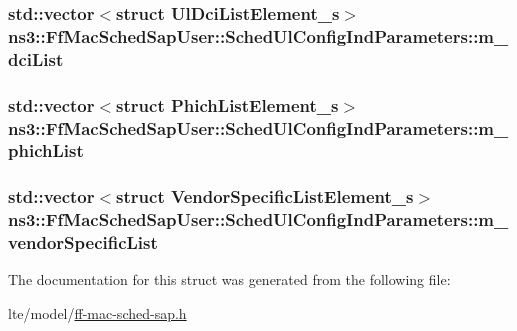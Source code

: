 \subsubsection[{\texorpdfstring{m\+\_\+dci\+List}{m_dciList}}]{\setlength{\rightskip}{0pt plus 5cm}std\+::vector$<$struct {\bf Ul\+Dci\+List\+Element\+\_\+s}$>$ ns3\+::\+Ff\+Mac\+Sched\+Sap\+User\+::\+Sched\+Ul\+Config\+Ind\+Parameters\+::m\+\_\+dci\+List}\hypertarget{structns3_1_1FfMacSchedSapUser_1_1SchedUlConfigIndParameters_aef61e9596b02d9d16bcb090889f30c18}{}\label{structns3_1_1FfMacSchedSapUser_1_1SchedUlConfigIndParameters_aef61e9596b02d9d16bcb090889f30c18}
\subsubsection[{\texorpdfstring{m\+\_\+phich\+List}{m_phichList}}]{\setlength{\rightskip}{0pt plus 5cm}std\+::vector$<$struct {\bf Phich\+List\+Element\+\_\+s}$>$ ns3\+::\+Ff\+Mac\+Sched\+Sap\+User\+::\+Sched\+Ul\+Config\+Ind\+Parameters\+::m\+\_\+phich\+List}\hypertarget{structns3_1_1FfMacSchedSapUser_1_1SchedUlConfigIndParameters_ab26f492098c355f8819697698c0aab43}{}\label{structns3_1_1FfMacSchedSapUser_1_1SchedUlConfigIndParameters_ab26f492098c355f8819697698c0aab43}
\subsubsection[{\texorpdfstring{m\+\_\+vendor\+Specific\+List}{m_vendorSpecificList}}]{\setlength{\rightskip}{0pt plus 5cm}std\+::vector$<$struct {\bf Vendor\+Specific\+List\+Element\+\_\+s}$>$ ns3\+::\+Ff\+Mac\+Sched\+Sap\+User\+::\+Sched\+Ul\+Config\+Ind\+Parameters\+::m\+\_\+vendor\+Specific\+List}\hypertarget{structns3_1_1FfMacSchedSapUser_1_1SchedUlConfigIndParameters_aa8e9611a38a06b56c7f7c4ff2d959d65}{}\label{structns3_1_1FfMacSchedSapUser_1_1SchedUlConfigIndParameters_aa8e9611a38a06b56c7f7c4ff2d959d65}


The documentation for this struct was generated from the following file\+:\begin{DoxyCompactItemize}
\item 
lte/model/\hyperlink{ff-mac-sched-sap_8h}{ff-\/mac-\/sched-\/sap.\+h}\end{DoxyCompactItemize}
